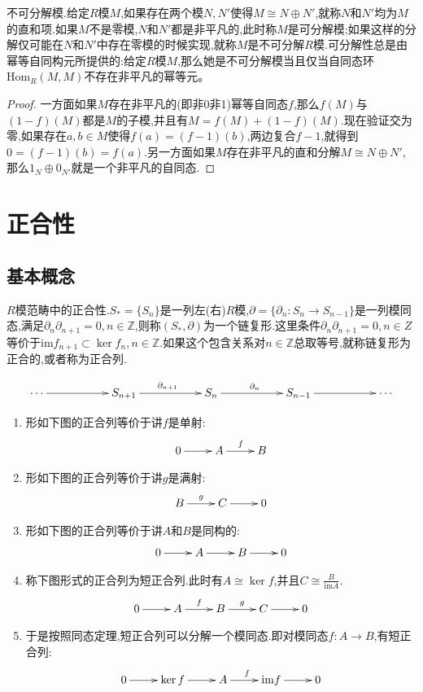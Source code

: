 不可分解模.给定$R$模$M$,如果存在两个模$N,N'$使得$M\cong N\oplus N'$,就称$N$和$N'$均为$M$的直和项.如果$M$不是零模,$N$和$N'$都是非平凡的,此时称$M$是可分解模;如果这样的分解仅可能在$N$和$N'$中存在零模的时候实现,就称$M$是不可分解$R$模.可分解性总是由幂等自同构元所提供的:给定$R$模$M$,那么她是不可分解模当且仅当自同态环$\mathrm{Hom}_R(M,M)$不存在非平凡的幂等元。
\begin{proof}
	
	一方面如果$M$存在非平凡的(即非0非1)幂等自同态$f$,那么$f(M)$与$(1-f)(M)$都是$M$的子模,并且有$M=f(M)+(1-f)(M)$.现在验证交为零,如果存在$a,b\in M$使得$f(a)=(f-1)(b)$,两边复合$f-1$,就得到$0=(f-1)(b)=f(a)$.另一方面如果$M$存在非平凡的直和分解$M\cong N\oplus N'$,那么$1_N\oplus 0_{N'}$就是一个非平凡的自同态.
\end{proof}



\newpage
\section{正合性}
\subsection{基本概念}

$R$模范畴中的正合性.$S_*=\{S_n\}$是一列左(右)$R$模,$\partial=\{\partial_n:S_n\to S_{n-1}\}$是一列模同态,满足$\partial_n\partial_ {n+1}=0,n\in \mathbb{Z}$,则称$(S_*,\partial)$为一个链复形.这里条件$\partial_n\partial_ {n+1}=0,n\in Z$等价于$\mathrm{im}f_{n+1}\subset\ker f_n,n\in\mathbb{Z}$.如果这个包含关系对$n\in\mathbb{Z}$总取等号,就称链复形为正合的,或者称为正合列.

$$\xymatrix{
	\cdots \ar[rr] && S_{n+1} \ar[rr]^{\partial_{n+1}} && S_n \ar[rr]^{\partial_n} && S_{n-1} \ar[rr]^{} &&\cdots }$$
\begin{enumerate}
	\item 形如下图的正合列等价于讲$f$是单射:
	$$\xymatrix{
		0\ar[r]&A\ar[r]^{f}&B}$$
	\item 形如下图的正合列等价于讲$g$是满射:
	$$\xymatrix{
		B\ar[r]^{g}&C\ar[r]&0}$$
	\item 形如下图的正合列等价于讲$A$和$B$是同构的:
	$$\xymatrix{
		0\ar[r]&A\ar[r]&B\ar[r]&0}$$
	\item 称下图形式的正合列为短正合列.此时有$A\cong\ker f$,并且$C\cong\frac{B}{\mathrm{im}A}$.
	$$\xymatrix{
		0\ar[r]&A\ar[r]^{f}&B\ar[r]^{g}&C\ar[r]&0}$$
	\item 于是按照同态定理,短正合列可以分解一个模同态.即对模同态$f:A\to B$,有短正合列:
	$$\xymatrix{
		0\ar[r]&\ker f\ar[r]&A\ar[r]^{f}&\mathrm{im}f\ar[r]&0}$$
\end{enumerate}

